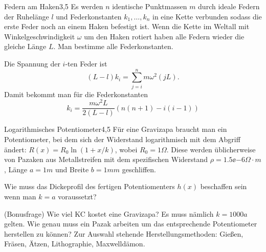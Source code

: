 



\begin{problem}{Federn am Haken}{3,5}
Es werden $n$ identische Punktmassen $m$ durch ideale Federn der Ruhelänge $l$ und Federkonstanten $k_1,\dots, k_n$ in eine Kette verbunden sodass die erste Feder noch an einem Haken befestigt ist. Wenn die Kette im Weltall mit Winkelgeschwindigkeit $\omega$ um den Haken rotiert haben alle Federn wieder die gleiche Länge $L$. Man bestimme alle Federkonstanten.
\begin{solution}
Die Spannung der $i$-ten Feder ist
\[
(L-l) k_i = \sum_{j=i}^n m \omega^2 (jL).
\]
Damit bekommt man für die Federkonstanten
\[
k_i = \frac{m \omega^2 L}{2 (L-l)} \left( n(n+1) - i(i-1) \right)
\]
\end{solution}
\end{problem}

\begin{problem}{Logarithmisches Potentiometer}{4,5}
Für eine Gravizapa braucht man ein Potentiometer, bei dem sich der Widerstand logarithmisch mit dem Abgriff ändert: $R(x) = R_0 \ln(1+x/k)$, wobei $R_0 = 1 \unit{\Omega}$. Diese werden üblicherweise von Pazaken aus Metallstreifen mit dem spezifischen Widerstand $\rho = 1.5\ee{-6} \unit{\Omega\cdot m}$, Länge $a = 1\unit{m}$ und Breite $b = 1\unit{mm}$ geschliffen.
\begin{abcenum}
\item Wie muss das Dickeprofil des fertigen Potentiomenters $h(x)$ beschaffen sein wenn man $k=a$ voraussetzt?
\item (Bonusfrage) Wie viel KC kostet eine Gravizapa? Es muss nämlich $k=1000 a$ gelten. Wie genau muss ein Pazak arbeiten um das entsprechende Potentiometer herstellen zu können? Zur Auswahl stehende Herstellungsmethoden: Gießen, Fräsen, Ätzen, Lithographie, Maxwelldämon.
\end{abcenum}
\end{problem}


